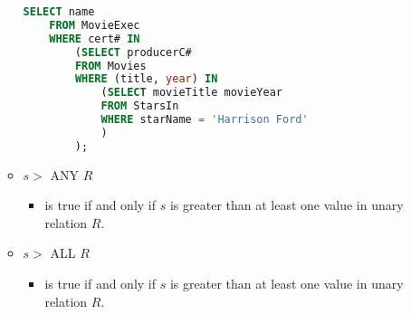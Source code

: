 \documentclass[12pt]{article}
\begin{document}
\begin{enumerate}[1.]
\begin{itemize}
    \begin{lstlisting}[language=SQL]
    SELECT name
    FROM MovieExec
    WHERE cert# IN
        (SELECT producerC#
        FROM Movies
        WHERE (title, year) IN
            (SELECT movieTitle movieYear
            FROM StarsIn
            WHERE starName = 'Harrison Ford'
            )
        );
    \end{lstlisting}

        \item $s >$ ANY $R$
        \begin{itemize}
            \item is true if and only if $s$ is greater than at least one value in
            unary relation $R$.
        \end{itemize}

        \item $s >$ ALL $R$
        \begin{itemize}
            \item is true if and only if $s$ is greater than at least one value in unary
            relation $R$.
        \end{itemize}
    \end{itemize}
\end{enumerate}
\end{document}
